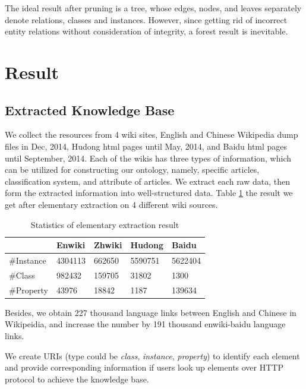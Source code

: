 \documentclass[runningheads,a4paper]{llncs}
\begin{document}
The ideal result after pruning is a tree, whose edges, nodes, and leaves separately denote relations, classes and instances. However, since getting rid of incorrect entity relations without consideration of integrity, a forest result is inevitable.

\section{Result}
\label{sec:result}

\subsection{Extracted Knowledge Base}
We collect the resources from 4 wiki sites, English and Chinese Wikipedia dump files in Dec, 2014, Hudong html pages until May, 2014, and Baidu html pages until September, 2014. Each of the wikis has three types of information, which can be utilized for constructing our ontology, namely, specific articles, classification system, and attribute of articles. We extract each raw data, then form the extracted information into well-structured data. Table \ref{tab:extract-result} the result we get after elementary extraction on 4 different wiki sources.

\begin{table}[]
    \small
    \centering
    \caption{Statistics of elementary extraction result}
    \label{tab:extract-result}
        \begin{tabular}{|l|l|l|l|l|}
            \hline
                       & Enwiki  & Zhwiki & Hudong  & Baidu   \\ \hline
            \#Instance & 4304113 & 662650 & 5590751 & 5622404 \\ \hline
            \#Class    & 982432  & 159705 & 31802   & 1300    \\ \hline
            \#Property & 43976   & 18842  & 1187    & 139634  \\ \hline
        \end{tabular}
\end{table}

Besides, we obtain 227 thousand language links between English and Chinese in Wikipeidia, and increase the number by 191 thousand enwiki-baidu language links.

We create URIs  (type could be \textit{class}, \textit{instance}, \textit{property}) to identify each element and provide corresponding information if users look up elements over HTTP protocol to achieve the knowledge base. 
\end{document}
